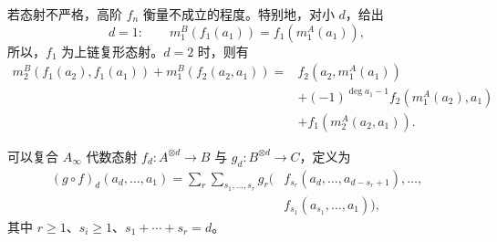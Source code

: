 若态射不严格，高阶 $f_n$ 衡量不成立的程度。特别地，对小 $d$，给出
\[
d=1:\qquad m_1^B(f_1(a_1))=f_1(m_1^A(a_1)),
\]
所以，$f_1$ 为上链复形态射。$d=2$ 时，则有
\begin{equation}\label{eq:8.8}
\begin{aligned}
m_2^B(f_1(a_2),f_1(a_1))+m_1^B(f_2(a_2,a_1))
={}&f_2(a_2,m_1^A(a_1))\\
&+(-1)^{\deg a_1-1}f_2(m_1^A(a_2),a_1)\\
&+f_1(m_2^A(a_2,a_1)).
\end{aligned}
\end{equation}

可以复合 $A_\infty$ 代数态射 $f_d\colon A^{\otimes d}\to B$ 与 $g_d\colon B^{\otimes d}\to C$，定义为
\[
\begin{aligned}
(g\circ f)_d(a_d,\ldots,a_1)
=\sum_r\sum_{s_1,\ldots,s_r}
g_r\bigl(&f_{s_r}(a_d,\ldots,a_{d-s_r+1}),\ldots,\\
&f_{s_1}(a_{s_1},\ldots,a_1)\bigr),
\end{aligned}
\]
其中 $r\geq1$、$s_i\geq1$、$s_1+\cdots+s_r=d$。


